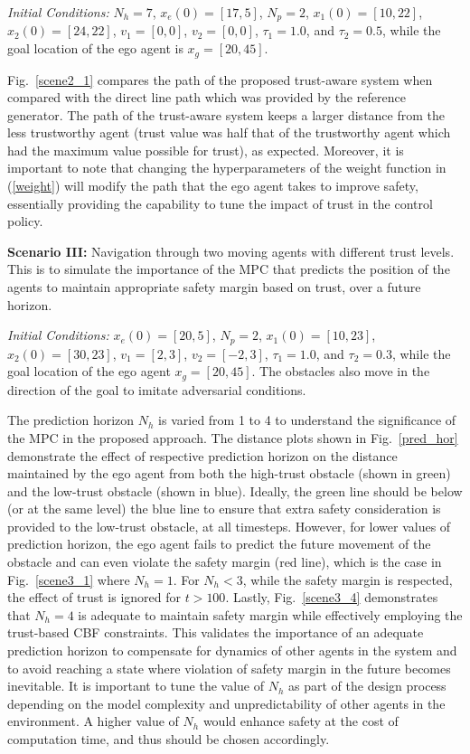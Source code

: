 \documentclass[journal]{IEEEtran}
\begin{document}
 \textit{Initial Conditions: } $N_h=7$, $x_e(0) = [17, 5]$, $N_p = 2$, $x_1(0) = [10, 22]$, $x_2(0) = [24, 22]$, $v_1 = [0, 0]$, $v_2 = [0, 0]$, $\tau_1 = 1.0$, and $\tau_2 = 0.5$, while the goal location of the ego agent is $x_g = [20, 45]$.

Fig.~\ref{scene2_1} compares the path of the proposed trust-aware system when compared with the direct line path which was provided by the reference generator. The path of the trust-aware system keeps a larger distance from the less trustworthy agent (trust value was half that of the trustworthy agent which had the maximum value possible for trust), as expected. Moreover, it is important to note that changing the hyperparameters of the weight function in (\ref{weight}) will modify the path that the ego agent takes to improve safety, essentially providing the capability to tune the impact of trust in the control policy.

\textbf{Scenario III:} Navigation through two moving agents with different trust levels. This is to simulate the importance of the MPC that predicts the position of the agents to maintain appropriate safety margin based on trust, over a future horizon. 
 
\textit{Initial Conditions: } $x_e(0) = [20, 5]$, $N_p = 2$, $x_1(0) = [10, 23]$, $x_2(0) = [30, 23]$, $v_{1} = [2, 3]$, $v_2 = [-2, 3]$, $\tau_1 = 1.0$, and $\tau_2 = 0.3$, while the goal location of the ego agent $x_g = [20, 45]$. The obstacles also move in the direction of the goal to imitate adversarial conditions. 

The prediction horizon $N_h$ is varied from 1 to 4 to understand the significance of the MPC in the proposed approach. The distance plots shown in Fig.~\ref{pred_hor} demonstrate the effect of respective prediction horizon on the distance maintained by the ego agent from both the high-trust obstacle (shown in green) and the low-trust obstacle (shown in blue). Ideally, the green line should be below (or at the same level) the blue line to ensure that extra safety consideration is provided to the low-trust obstacle, at all timesteps. However, for lower values of prediction horizon, the ego agent fails to predict the future movement of the obstacle and can even violate the safety margin (red line), which is the case in Fig.~\ref{scene3_1} where $N_h=1$. For $N_h<3$, while the safety margin is respected, the effect of trust is ignored for $t>100$. Lastly, Fig.~\ref{scene3_4} demonstrates that $N_h=4$ is adequate to maintain safety margin while effectively employing the trust-based CBF constraints. This validates the importance of an adequate prediction horizon to compensate for dynamics of other agents in the system and to avoid reaching a state where violation of safety margin in the future becomes inevitable. It is important to tune the value of $N_h$ as part of the design process depending on the model complexity and unpredictability of other agents in the environment. A higher value of $N_h$ would enhance safety at the cost of computation time, and thus should be chosen accordingly. 
\end{document}
